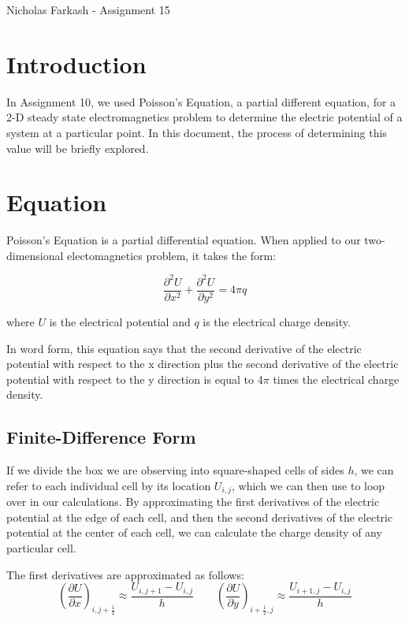 \documentclass[12pt]{article}
\begin{document}
\begin{center}
  Nicholas Farkash - Assignment 15
\end{center}

\section{Introduction}
In Assignment 10, we used Poisson's Equation, a partial different equation, for
a 2-D steady state electromagnetics problem to determine the electric potential
of a system at a particular point. In this document, the process of determining
this value will be briefly explored.


\section{Equation}
Poisson's Equation is a partial differential equation. When applied to our
two-dimensional electomagnetics problem, it takes the form:

\begin{equation} \frac{\partial^2 U}{\partial x^2} + \frac{\partial^2 U}{\partial
                 y^2} = 4 \pi q \label{Poisson}
\end{equation}

where $U$ is the electrical potential and $q$ is the electrical charge density.

In word form, this equation says that the second derivative of the electric
potential with respect to the x direction plus the second derivative of the
electric potential with respect to the y direction is equal to 4$\pi$ times
the electrical charge density.

\subsection{Finite-Difference Form}
If we divide the box we are observing into square-shaped cells of sides $h$, we
can refer to each individual cell by its location $U_{i,j}$, which we can then
use to loop over in our calculations. By approximating the first derivatives of
the electric potential at the edge of each cell, and then the second derivatives
of the electric potential at the center of each cell, we can calculate the
charge density of any particular cell.

The first derivatives are approximated as follows:
\begin{equation}
  \left(\frac{\partial U}{\partial x}\right)_{i,j+\frac{1}{2}} \approx
  \frac{U_{i,j+1}-U_{i,j}}{h}
\hspace{24pt}
  \left(\frac{\partial U}{\partial y}\right)_{i+\frac{1}{2},j} \approx
  \frac{U_{i+1,j}-U_{i,j}}{h}
\end{equation} 
\end{document}
